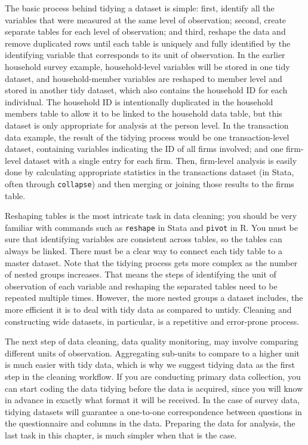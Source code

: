 The basic process behind tidying a dataset is simple: 
first, identify all the variables that were measured at the same level of observation;
second, create separate tables for each level of observation;
and third, reshape 
the data and remove duplicated rows 
until each table is uniquely and fully identified by the identifying variable 
that corresponds to its unit of observation.
In the earlier household survey example,
household-level variables will be stored in one tidy dataset, 
and household-member variables are reshaped to member level and stored in another tidy dataset,
which also contains the household ID for each individual.
The household ID is intentionally duplicated in the household members table
to allow it to be linked to the household data table,
but this dataset is only appropriate for analysis at the person level.
In the transaction data example,
the result of the tidying process would be one transaction-level dataset, 
containing variables indicating the ID of all firms involved;
and one firm-level dataset with a single entry for each firm.
Then, firm-level analysis is easily done 
by calculating appropriate statistics in the transactions dataset
(in Stata, often through \texttt{collapse})
and then merging or joining those results to the firms table.

Reshaping tables is the most intricate task in data cleaning;
you should be very familiar with commands such as \texttt{reshape} in Stata and \texttt{pivot} in R.
You must be sure that identifying variables are consistent across tables,
so the tables can always be linked.
There must be a clear way to connect each tidy table to a master dataset.
Note that the tidying process gets more complex as the number of nested groups increases.
That means the steps of identifying the unit of observation of each variable
and reshaping the separated tables need to be repeated multiple times.
However, the more nested groups a dataset includes,
the more efficient it is to deal with tidy data as compared to untidy.
Cleaning and constructing wide datasets, in particular,
is a repetitive and error-prone process.

The next step of data cleaning, data quality monitoring,
may involve comparing different units of observation.
Aggregating sub-units to compare to a higher unit is much easier with tidy data,
which is why we suggest tidying data as the first step in the cleaning workflow. 
If you are conducting primary data collection,
you can start coding the data tidying before the data is acquired,
since you will know in advance in exactly what format it will be received.
In the case of survey data,
tidying datasets will guarantee a one-to-one correspondence
between questions in the questionnaire and columns in the data.
Preparing the data for analysis, the last task in this chapter, 
is much simpler when that is the case. 
 
